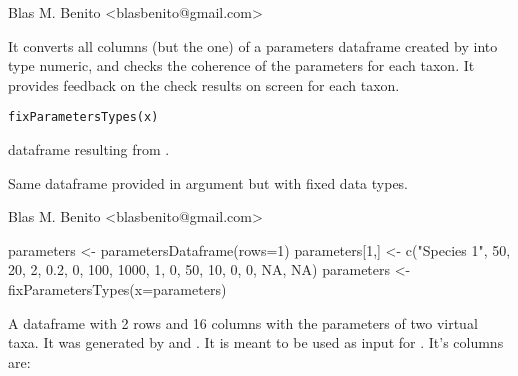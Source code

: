 \documentclass[letterpaper]{book}
\begin{document}
%
\begin{Author}\relax
Blas M. Benito  <blasbenito@gmail.com>
\end{Author}
%
\begin{SeeAlso}\relax
{}
\end{SeeAlso}
%
\begin{Description}\relax
It converts all columns (but the  one) of a parameters dataframe created by  into type numeric, and checks the coherence of the parameters for each taxon. It provides feedback on the check results on screen for each taxon.
\end{Description}
%
\begin{Usage}
\begin{verbatim}
fixParametersTypes(x)
\end{verbatim}
\end{Usage}
%
\begin{Arguments}
\begin{ldescription}
\item[\code{x}] dataframe resulting from .
\end{ldescription}
\end{Arguments}
%
\begin{Value}
Same dataframe provided in argument  but with fixed data types.
\end{Value}
%
\begin{Author}\relax
Blas M. Benito  <blasbenito@gmail.com>
\end{Author}
%
\begin{SeeAlso}\relax
{}
\end{SeeAlso}
%
\begin{Examples}
\begin{ExampleCode}

parameters <- parametersDataframe(rows=1)
parameters[1,] <- c("Species 1", 50, 20, 2, 0.2, 0, 100, 1000, 1, 0, 50, 10, 0, 0, NA, NA)
parameters <- fixParametersTypes(x=parameters)

\end{ExampleCode}
\end{Examples}
%
\begin{Description}\relax
A dataframe with 2 rows and 16 columns with the parameters of two virtual taxa. It was generated by  and . It is meant to be used as input for . It's columns are:
\end{Description}
\end{document}
